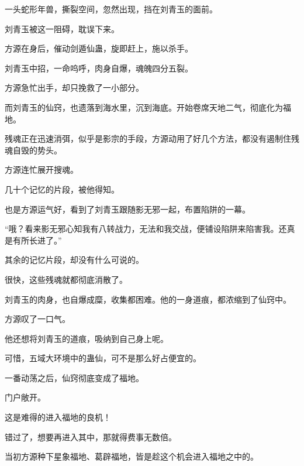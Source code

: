 \begin{this_body}
一头蛇形年兽，撕裂空间，忽然出现，挡在刘青玉的面前。

刘青玉被这一阻碍，耽误下来。

方源在身后，催动剑遁仙蛊，旋即赶上，施以杀手。

刘青玉中招，一命呜呼，肉身自爆，魂魄四分五裂。

方源急忙出手，却只挽救了一小部分。

而刘青玉的仙窍，也遗落到海水里，沉到海底。开始卷席天地二气，彻底化为福地。

残魂正在迅速消弭，似乎是影宗的手段，方源动用了好几个方法，都没有遏制住残魂自毁的势头。

方源连忙展开搜魂。

几十个记忆的片段，被他得知。

也是方源运气好，看到了刘青玉跟随影无邪一起，布置陷阱的一幕。

“哦？看来影无邪心知我有八转战力，无法和我交战，便铺设陷阱来陷害我。还真是有所长进了。”

其余的记忆片段，却没有什么可说的。

很快，这些残魂就都彻底消散了。

刘青玉的肉身，也自爆成糜，收集都困难。他的一身道痕，都浓缩到了仙窍中。

方源叹了一口气。

他还想将刘青玉的道痕，吸纳到自己身上呢。

可惜，五域大环境中的蛊仙，可不是那么好占便宜的。

一番动荡之后，仙窍彻底变成了福地。

门户敞开。

这是难得的进入福地的良机！

错过了，想要再进入其中，那就得费事无数倍。

当初方源种下星象福地、葛辟福地，皆是趁这个机会进入福地之中的。

\end{this_body}

